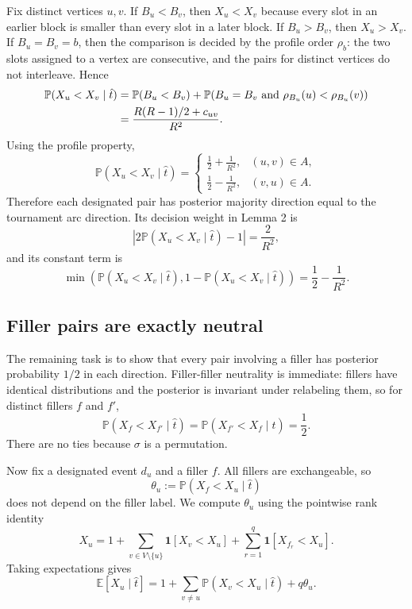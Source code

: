 \documentclass[11pt]{article}
\newcommand{\E}{\mathbb{E}}
\newcommand{\Prb}{\mathbb{P}}
\newcommand{\ind}{\mathbf{1}}
\begin{document}
Fix distinct vertices $u,v$.  If $B_u<B_v$, then $X_u<X_v$ because every slot in an earlier block is smaller than every slot in a later block.  If $B_u>B_v$, then $X_u>X_v$.  If $B_u=B_v=b$, then the comparison is decided by the profile order $\rho_b$: the two slots assigned to a vertex are consecutive, and the pairs for distinct vertices do not interleave.  Hence
\begin{align}
  \Prb(X_u<X_v\mid \hat t)
  &=\Prb(B_u<B_v)+\Prb(B_u=B_v\text{ and }\rho_{B_u}(u)<\rho_{B_u}(v)) \notag\\
  &=\frac{R(R-1)/2+c_{uv}}{R^2}.
\end{align}
Using the profile property,
\begin{equation}
  \Prb(X_u<X_v\mid \hat t)
  =
  \begin{cases}
    \displaystyle \frac12+\frac1{R^2}, & (u,v)\in A,\\[6pt]
    \displaystyle \frac12-\frac1{R^2}, & (v,u)\in A.
  \end{cases}
\end{equation}
Therefore each designated pair has posterior majority direction equal to the tournament arc direction.  Its decision weight in Lemma 2 is
\begin{equation}
  \left|2\Prb(X_u<X_v\mid \hat t)-1\right|=\frac2{R^2},
\end{equation}
and its constant term is
\begin{equation}
  \min\left(\Prb(X_u<X_v\mid \hat t),1-\Prb(X_u<X_v\mid \hat t)\right)
  =\frac12-\frac1{R^2}.
\end{equation}

\subsection{Filler pairs are exactly neutral}

The remaining task is to show that every pair involving a filler has posterior probability $1/2$ in each direction.  Filler-filler neutrality is immediate: fillers have identical distributions and the posterior is invariant under relabeling them, so for distinct fillers $f$ and $f'$,
\begin{equation}
  \Prb(X_f<X_{f'}\mid \hat t)=\Prb(X_{f'}<X_f\mid \hat t)=\frac12.
\end{equation}
There are no ties because $\sigma$ is a permutation.

Now fix a designated event $d_u$ and a filler $f$.  All fillers are exchangeable, so
\begin{equation}
  \theta_u:=\Prb(X_f<X_u\mid \hat t)
\end{equation}
does not depend on the filler label.  We compute $\theta_u$ using the pointwise rank identity
\begin{equation}
  X_u=1+
  \sum_{v\in V\setminus\{u\}}\ind[X_v<X_u]
  +\sum_{r=1}^q\ind[X_{f_r}<X_u].
\end{equation}
Taking expectations gives
\begin{equation}
  \E[X_u\mid \hat t]
  =1+
  \sum_{v\ne u}\Prb(X_v<X_u\mid \hat t)
  +q\theta_u.
\end{equation}
\end{document}
